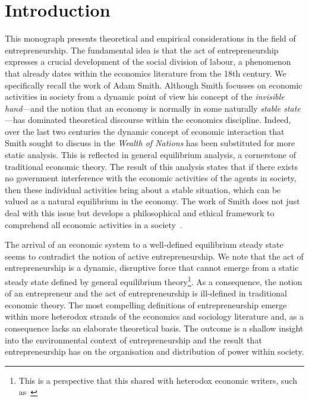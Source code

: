 \setcounter{page}{1} 
\chapter{Introduction}

This monograph presents theoretical and empirical considerations in the field of entrepreneurship. The fundamental idea is that the act of entrepreneurship expresses a crucial development of the social division of labour, a phenomenon that already dates within the economics literature from the 18th century. We specifically recall the work of Adam Smith. Although Smith focusses on economic activities in society from a dynamic point of view his concept of the \emph{invisible hand}---and the notion that an economy is normally in some naturally \emph{stable state}---has dominated theoretical discourse within the economics discipline. Indeed, over the last two centuries the dynamic concept of economic interaction that Smith sought to discuss in the \emph{Wealth of Nations} has been substituted for more static analysis. This is reflected in general equilibrium analysis, a cornerstone of traditional economic theory. The result of this analysis states that if there exists no government interference with the economic activities of the agents in society, then these individual activities bring about a stable situation, which can be valued as a natural equilibrium in the economy. The work of Smith does not just deal with this issue but develops a philosophical and ethical framework to comprehend all economic activities in a society~\citep{Gilles1990}.

The arrival of an economic system to a well-defined equilibrium steady state seems to contradict the notion of active entrepreneurship. We note that the act of entrepreneurship is a dynamic, disruptive force that cannot emerge from a static steady state defined by general equilibrium theory\footnote{This is a perspective that this shared with heterodox economic writers, such as~\citet{Schumpeter1942}}. As a consequence, the notion of an entrepreneur and the act of entrepreneurship is ill-defined in traditional economic theory. The most compelling definitions of entrepreneurship emerge within more heterodox strands of the economics and sociology literature and, as a consequence lacks an elaborate theoretical basis. The outcome is a shallow insight into the environmental context of entrepreneurship and the result that entrepreneurship has on the organisation and distribution of power within society.

